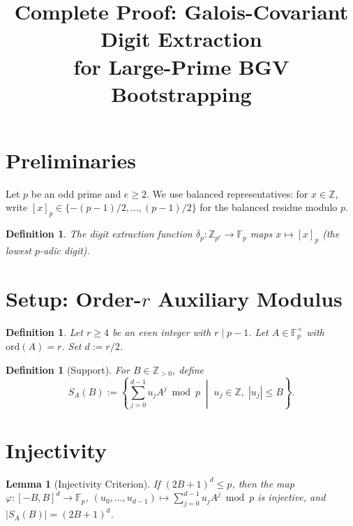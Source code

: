 \documentclass[11pt]{article}
\newtheorem{lemma}[theorem]{Lemma}
\newtheorem{definition}[theorem]{Definition}
\newcommand{\Fp}{\mathbb{F}_p}
\newcommand{\Zpe}{\mathbb{Z}_{p^e}}
\newcommand{\ord}{\mathrm{ord}}
\begin{document}
\title{Complete Proof: Galois-Covariant Digit Extraction\\for Large-Prime BGV Bootstrapping}
\date{}
\maketitle

\section{Preliminaries}

Let $p$ be an odd prime and $e \geq 2$. We use balanced representatives: for $x \in \mathbb{Z}$, write $[x]_p \in \{-(p-1)/2, \ldots, (p-1)/2\}$ for the balanced residue modulo $p$.

\begin{definition}
The \emph{digit extraction function} $\delta_p : \Zpe \to \Fp$ maps $x \mapsto [x]_p$ (the lowest $p$-adic digit).
\end{definition}

\section{Setup: Order-$r$ Auxiliary Modulus}

\begin{definition}
Let $r \geq 4$ be an even integer with $r \mid p-1$. Let $A \in \Fp^\times$ with $\ord(A) = r$. Set $d := r/2$.
\end{definition}

\begin{definition}[Support]
For $B \in \mathbb{Z}_{>0}$, define
\[
S_A(B) := \left\{ \sum_{j=0}^{d-1} u_j A^j \bmod p \;\middle|\; u_j \in \mathbb{Z}, \; |u_j| \leq B \right\}.
\]
\end{definition}

\section{Injectivity}

\begin{lemma}[Injectivity Criterion]\label{lem:inject}
If $(2B+1)^d \leq p$, then the map
$\varphi: [-B,B]^d \to \Fp$, $(u_0,\ldots,u_{d-1}) \mapsto \sum_{j=0}^{d-1} u_j A^j \bmod p$
is injective, and $|S_A(B)| = (2B+1)^d$.
\end{lemma}
\end{document}
